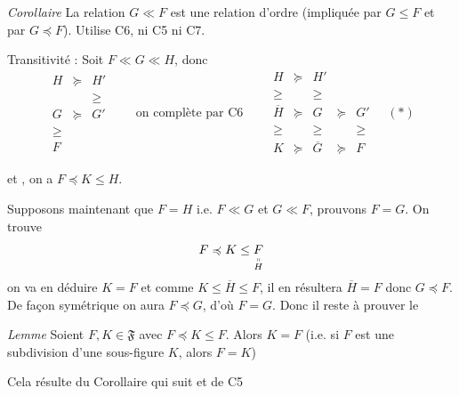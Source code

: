 \documentclass[11pt,a4paper]{article}
\begin{document}
\emph{Corollaire} \struck{\ill{}} \quad La relation $G \ll F$ est une relation d'ordre (impliquée par $G \leq F$ et par $G \preccurlyeq F$). Utilise C6, ni C5 ni C7.

Transitivité : Soit $F \ll G \ll H$, donc
\[
  \begin{array}{ccc}
    H & \succcurlyeq & H' \\
    & & \geq \\
    G & \succcurlyeq & G' \\
    \geq & & \\
    F & &
  \end{array}
  \qquad \text{on complète par C6} \qquad
  \begin{array}{ccccc}
    H & \succcurlyeq & H' & & \\
    \geq & & \geq & & \\
    \overline{H} & \succcurlyeq & G & \succcurlyeq & G' \\
    \geq & & \geq & & \geq \\
    K & \succcurlyeq & \overline{G} & \succcurlyeq & F
  \end{array}
  \quad (*)
\]

et \ill{}, on a $F \preccurlyeq K \leq H$.

Supposons maintenant que $F = H$ i.e. $F \ll G$ et $G \ll F$, prouvons $F = G$. On trouve
\[
  F \preccurlyeq K \leq \underset{\overset{\shortparallel}{H}}{F}
\]
on va en déduire $K = F$ et comme $K \leq \overline{H} \leq F$, il en résultera $\overline{H} = F$  donc $G \preccurlyeq F$. De façon symétrique on aura $F \preccurlyeq G$, d'où $F = G$. Donc il reste à prouver le

\emph{Lemme} \quad Soient $F, K \in \mathfrak{F}$ avec $F \preccurlyeq K \leq F$. Alors $K = F$ (i.e. si $F$ est une subdivision d'une sous-figure $K$, alors $F = K$)

Cela résulte du Corollaire qui suit et de C5
\end{document}
